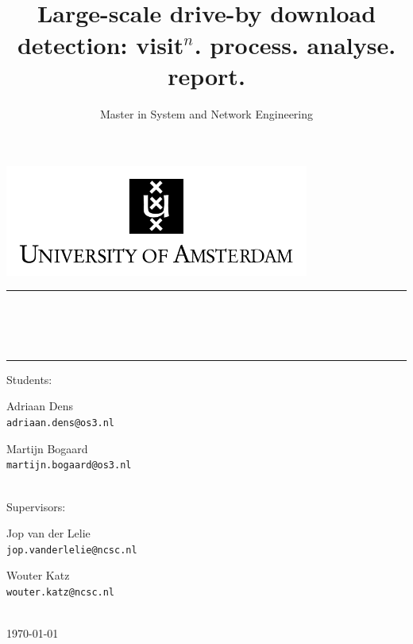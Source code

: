 \documentclass{scrartcl}
\title{\horizontalrule{1pt}\\[0.5cm]Large-scale drive-by download detection: visit$^n$. process. analyse. report.}
\subtitle{Master in System and Network Engineering \\[0.5cm] \horizontalrule{1pt} }
\author{}
\date{}
\newcommand{\horizontalrule}[1]{\rule{\linewidth}{#1}}
\begin{document}

\centerline{\includegraphics[width=10cm]{Images/UvA-logo-english}}

\begin{center}
\horizontalrule{1pt}\\[0.5cm]
\\[0.1cm]
 \\[0.5cm]
\horizontalrule{1pt} 
\end{center}

\vspace{7cm}

\begin{center}

\Large
Students:\\[0.5cm]

\begin{minipage}{0.4\textwidth}
\begin{flushleft} \Large
Adriaan Dens\\\texttt{adriaan.dens@os3.nl}
\end{flushleft}
\end{minipage}%
\begin{minipage}{0.4\textwidth}
\begin{flushright} \Large
Martijn Bogaard\\\texttt{martijn.bogaard@os3.nl}
\end{flushright}
\end{minipage}\\[1.6cm]

\Large
Supervisors:\\[0.5cm]

\begin{minipage}{0.4\textwidth}
\begin{flushleft} \Large
Jop van der Lelie\\\texttt{jop.vanderlelie@ncsc.nl}
\end{flushleft}
\end{minipage}%
\begin{minipage}{0.4\textwidth}
\begin{flushright} \Large
Wouter Katz\\\texttt{wouter.katz@ncsc.nl}
\end{flushright}
\end{minipage}\\[1.6cm]

{\Large \today}
\end{center}
\end{document}
